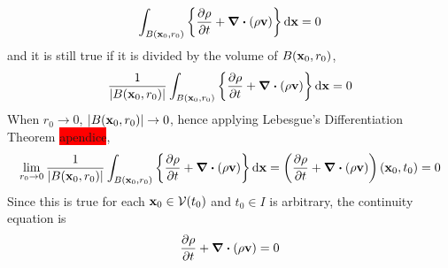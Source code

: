 \begin{equation}
	\int_{B(\vb{x}_0, r_0)} \left\{ \frac{\partial \rho}{\partial t} + \div(\rho \vb{v}) \right\} \dd{\vb{x}} = 0
\end{equation}
and it is still true if it is divided by the volume of $B(\vb{x}_0, r_0)$,
\begin{equation}
	\frac{1}{\abs{B(\vb{x}_0, r_0)}}
	\int_{B(\vb{x}_0, r_0)} \left\{ \frac{\partial \rho}{\partial t} + \div(\rho \vb{v}) \right\} \dd{\vb{x}} = 0
\end{equation}
When $r_0 \to 0$, $\abs{B(\vb{x}_0, r_0)} \to 0$, hence applying Lebesgue's Differentiation Theorem \colorbox{red}{apendice},
\begin{equation}
	\lim_{r_0 \to 0}
	\frac{1}{\abs{B(\vb{x}_0, r_0)}}
	\int_{B(\vb{x}_0, r_0)} \left\{ \frac{\partial \rho}{\partial t} + \div(\rho \vb{v}) \right\} \dd{\vb{x}} = 
	\left( \frac{\partial \rho}{\partial t} + \div(\rho \vb{v}) \right) (\vb{x}_0, t_0) = 0
\end{equation}
Since this is true for each $\vb{x}_0 \in \mathcal{V}(t_0)$ and $t_0 \in I$ is arbitrary, the continuity equation is
\begin{equation}
	\pdv{\rho}{t} + \div(\rho \vb{v}) = 0
\end{equation}

